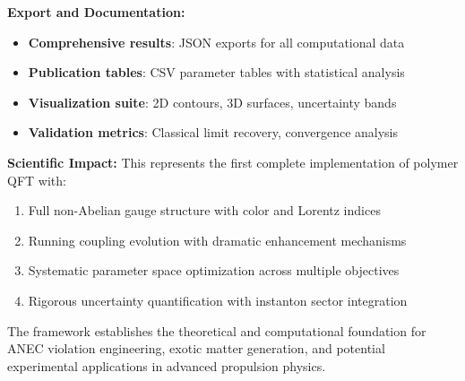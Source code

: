 \documentclass[11pt]{article}
\begin{document}
\textbf{Export and Documentation:}
\begin{itemize}
    \item \textbf{Comprehensive results}: JSON exports for all computational data
    \item \textbf{Publication tables}: CSV parameter tables with statistical analysis
    \item \textbf{Visualization suite}: 2D contours, 3D surfaces, uncertainty bands
    \item \textbf{Validation metrics}: Classical limit recovery, convergence analysis
\end{itemize}

\textbf{Scientific Impact:} This represents the first complete implementation of polymer QFT with:
\begin{enumerate}
    \item Full non-Abelian gauge structure with color and Lorentz indices
    \item Running coupling evolution with dramatic enhancement mechanisms  
    \item Systematic parameter space optimization across multiple objectives
    \item Rigorous uncertainty quantification with instanton sector integration
\end{enumerate}

The framework establishes the theoretical and computational foundation for ANEC violation engineering, exotic matter generation, and potential experimental applications in advanced propulsion physics.
\end{document}

